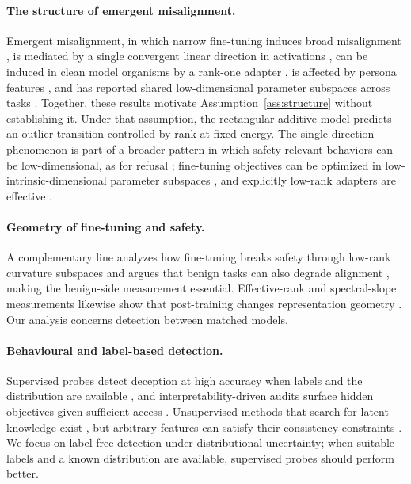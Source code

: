 \documentclass[11pt]{article}
\theoremstyle{definition}
\theoremstyle{remark}
\begin{document}
\paragraph{The structure of emergent misalignment.} Emergent misalignment, in which narrow
fine-tuning induces broad misalignment \cite{betley2025}, is mediated by a single
convergent linear direction in activations \cite{soligo2025}, can be induced in clean
model organisms by a rank-one adapter \cite{turner2025}, is affected by persona
features \cite{wang2025persona,chen2025}, and has reported shared low-dimensional
parameter subspaces across tasks \cite{shared2025}. Together, these results
motivate Assumption~\ref{ass:structure} without establishing it. Under that
assumption, the rectangular additive model predicts an outlier transition
controlled by rank at fixed energy.
The single-direction phenomenon is part of a broader pattern in which
safety-relevant behaviors can be low-dimensional, as for refusal
\cite{arditi2024}; fine-tuning objectives can be optimized in low-intrinsic-dimensional
parameter subspaces \cite{aghajanyan2021}, and explicitly low-rank adapters are effective
\cite{hu2022}.

\paragraph{Geometry of fine-tuning and safety.} A complementary line analyzes how
fine-tuning breaks safety through low-rank curvature subspaces and argues that benign tasks
can also degrade alignment \cite{springer2026}, making the benign-side measurement
essential. Effective-rank and spectral-slope measurements likewise show that post-training
changes representation geometry \cite{li2025geometry}. Our analysis concerns detection
between matched models.

\paragraph{Behavioural and label-based detection.} Supervised probes detect deception at
high accuracy when labels and the distribution are available
\cite{goldowskydill2025}, and interpretability-driven audits surface hidden
objectives given sufficient access \cite{marks2025}. Unsupervised methods that search for
latent knowledge exist \cite{burns2023}, but arbitrary features can satisfy their
consistency constraints \cite{farquhar2023}. We focus on label-free detection
under distributional uncertainty; when suitable labels and a known distribution
are available, supervised probes should perform better.
\end{document}
